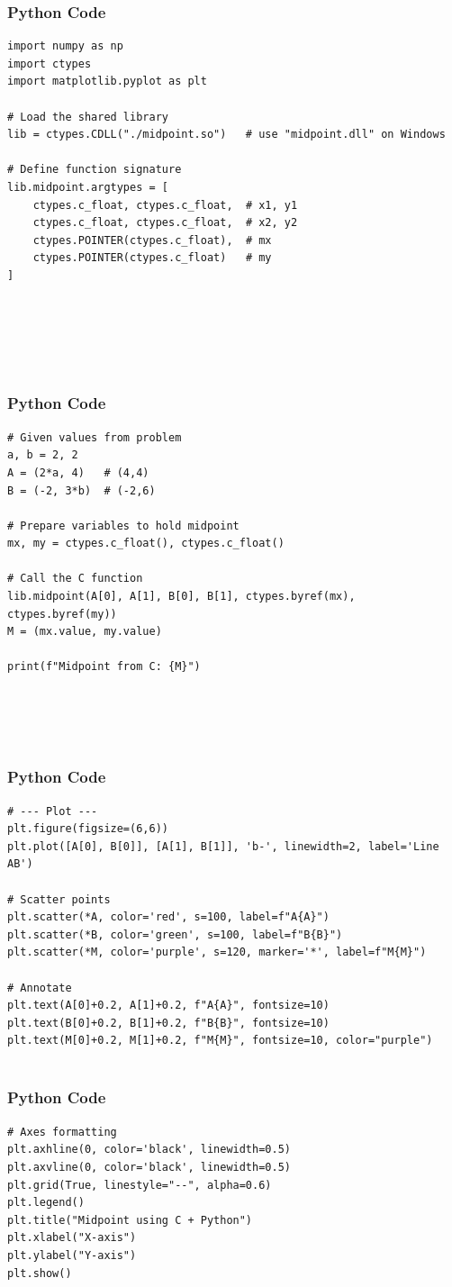 \documentclass{beamer}
\begin{document}
\begin{frame}[fragile]
    \frametitle{Python Code}
    \begin{lstlisting}
import numpy as np
import ctypes
import matplotlib.pyplot as plt

# Load the shared library
lib = ctypes.CDLL("./midpoint.so")   # use "midpoint.dll" on Windows

# Define function signature
lib.midpoint.argtypes = [
    ctypes.c_float, ctypes.c_float,  # x1, y1
    ctypes.c_float, ctypes.c_float,  # x2, y2
    ctypes.POINTER(ctypes.c_float),  # mx
    ctypes.POINTER(ctypes.c_float)   # my
]






    \end{lstlisting}
\end{frame}

\begin{frame}[fragile]
    \frametitle{Python Code}
    \begin{lstlisting}
# Given values from problem
a, b = 2, 2
A = (2*a, 4)   # (4,4)
B = (-2, 3*b)  # (-2,6)

# Prepare variables to hold midpoint
mx, my = ctypes.c_float(), ctypes.c_float()

# Call the C function
lib.midpoint(A[0], A[1], B[0], B[1], ctypes.byref(mx), ctypes.byref(my))
M = (mx.value, my.value)

print(f"Midpoint from C: {M}")





    \end{lstlisting}
\end{frame}

\begin{frame}[fragile]
    \frametitle{Python Code}

    \begin{lstlisting}
# --- Plot ---
plt.figure(figsize=(6,6))
plt.plot([A[0], B[0]], [A[1], B[1]], 'b-', linewidth=2, label='Line AB')

# Scatter points
plt.scatter(*A, color='red', s=100, label=f"A{A}")
plt.scatter(*B, color='green', s=100, label=f"B{B}")
plt.scatter(*M, color='purple', s=120, marker='*', label=f"M{M}")

# Annotate
plt.text(A[0]+0.2, A[1]+0.2, f"A{A}", fontsize=10)
plt.text(B[0]+0.2, B[1]+0.2, f"B{B}", fontsize=10)
plt.text(M[0]+0.2, M[1]+0.2, f"M{M}", fontsize=10, color="purple")


    \end{lstlisting}
\end{frame}
\begin{frame}[fragile]
    \frametitle{Python Code}

    \begin{lstlisting}
# Axes formatting
plt.axhline(0, color='black', linewidth=0.5)
plt.axvline(0, color='black', linewidth=0.5)
plt.grid(True, linestyle="--", alpha=0.6)
plt.legend()
plt.title("Midpoint using C + Python")
plt.xlabel("X-axis")
plt.ylabel("Y-axis")
plt.show()


    \end{lstlisting}
\end{frame}
\end{document}
